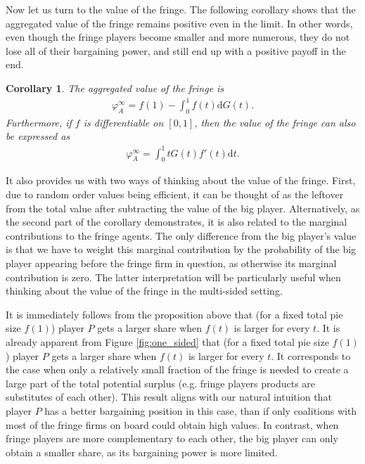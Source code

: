 \documentclass[a4paper]{article}
\newtheorem{corollary}{Corollary}
\newcommand{\dt}{\mathrm{d}t}
\newcommand{\dG}{\mathrm{d}G}
\begin{document}
Now let us turn to the value of the fringe.
The following corollary shows that the aggregated value of the fringe remains positive even in the limit.
In other words, even though the fringe players become smaller and more numerous, they do not lose all of their bargaining power, and still end up with a positive payoff in the end.
\begin{corollary}
    \label{cor:fringe_value_general}
    The aggregated value of the fringe is
    \begin{align*}
        \varphi_A^\infty = f(1) - \int_0^1 f(t) \dG(t).
    \end{align*}
    Furthermore, if $f$ is differentiable on $[0, 1]$, then the value of the fringe can also be expressed as
    \begin{align*}
        \varphi_A^\infty = \int_0^1 t G(t) f'(t) \dt.
    \end{align*}
\end{corollary}

It also provides us with two ways of thinking about the value of the fringe.
First, due to random order values being efficient, it can be thought of as the leftover from the total value after subtracting the value of the big player.
Alternatively, as the second part of the corollary demonstrates, it is also related to the marginal contributions to the fringe agents.
The only difference from the big player's value is that we have to weight this marginal contribution by the probability of the big player appearing before the fringe firm in question, as otherwise its marginal contribution is zero.
The latter interpretation will be particularly useful when thinking about the value of the fringe in the multi-sided setting.

It is immediately follows from the proposition above that (for a fixed total pie size $f(1)$) player $P$ gets a larger share when $f(t)$ is larger for every $t$.
It is already apparent from Figure \ref{fig:one_sided} that (for a fixed total pie size $f(1)$) player $P$ gets a larger share when $f(t)$ is larger for every $t$.
It corresponds to the case when only a relatively small fraction of the fringe is needed to create a large part of the total potential surplus (e.g. fringe players products are substitutes of each other).
This result aligns with our natural intuition that player $P$ has a better bargaining position in this case, than if only coalitions with most of the fringe firms on board could obtain high values.
In contrast, when fringe players are more complementary to each other, the big player can only obtain a smaller share, as its bargaining power is more limited.
\end{document}
